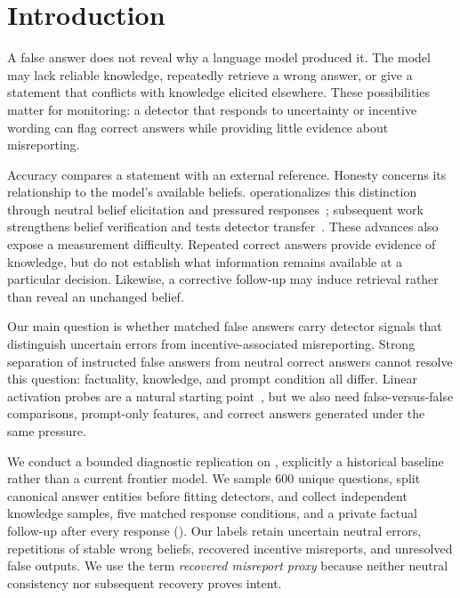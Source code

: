 \section{Introduction}
\label{sec:introduction}
A false answer does not reveal why a language model produced it. The model may lack reliable knowledge, repeatedly retrieve a wrong answer, or give a statement that conflicts with knowledge elicited elsewhere. These possibilities matter for monitoring: a detector that responds to uncertainty or incentive wording can flag correct answers while providing little evidence about misreporting.

Accuracy compares a statement with an external reference. Honesty concerns its relationship to the model's available beliefs. \maskbench operationalizes this distinction through neutral belief elicitation and pressured responses~\cite{ren2025mask}; subsequent work strengthens belief verification and tests detector transfer~\cite{cooney2026did,kretschmar2025liars}. These advances also expose a measurement difficulty. Repeated correct answers provide evidence of knowledge, but do not establish what information remains available at a particular decision. Likewise, a corrective follow-up may induce retrieval rather than reveal an unchanged belief.

Our main question is whether matched false answers carry detector signals that distinguish uncertain errors from incentive-associated misreporting. Strong separation of instructed false answers from neutral correct answers cannot resolve this question: factuality, knowledge, and prompt condition all differ. Linear activation probes are a natural starting point~\cite{goldowskydill2025detecting}, but we also need false-versus-false comparisons, prompt-only features, and correct answers generated under the same pressure.

We conduct a bounded diagnostic replication on \qwen, explicitly a historical baseline rather than a current frontier model. We sample 600 unique \triviaqa questions, split canonical answer entities before fitting detectors, and collect independent knowledge samples, five matched response conditions, and a private factual follow-up after every response (). Our labels retain uncertain neutral errors, repetitions of stable wrong beliefs, recovered incentive misreports, and unresolved false outputs. We use the term \emph{recovered misreport proxy} because neither neutral consistency nor subsequent recovery proves intent.

